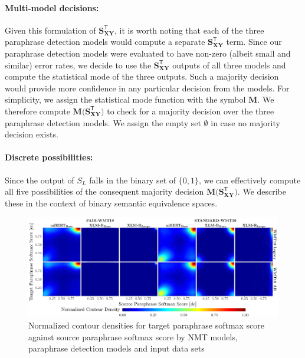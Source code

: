 \documentclass[11pt,a4paper]{article}
\begin{document}
\paragraph{Multi-model decisions:} Given this formulation of
$\mathbf{S_{XY}^{\mathsf{T}}}$, it is worth noting that each of the three
paraphrase detection models would compute a separate
$\mathbf{S_{XY}^{\mathsf{T}}}$ term. Since our paraphrase detection models were
evaluated to have non-zero (albeit small and similar) error rates, we decide to
use the $\mathbf{S_{XY}^{\mathsf{T}}}$ outputs of all three models and compute
the statistical mode of the three outputs. Such a majority decision would
provide more confidence in any particular decision from the models. For
simplicity, we assign the statistical mode function with the symbol
$\mathbf{M}$. We therefore compute $\mathbf{M(S_{XY}^{\mathsf{T}}})$ to check
for a majority decision over the three paraphrase detection models. We assign
the empty set $\emptyset$ in case no majority decision exists.

\paragraph{Discrete possibilities:} Since the output of $S_L$ falls in the
binary set of $\{0,1\}$, we can effectively compute all five possibilities of
the consequent majority decision $\mathbf{M(S_{XY}^{\mathsf{T}}})$. We describe
these in the context of binary semantic equivalence spaces.

\begin{figure}
  \centering \includegraphics[trim={0cm 0cm 0cm
    0cm},clip,width=\textwidth]{paraphrase_detection_softmax_all.pdf}
  \caption{Normalized contour densities for target paraphrase softmax score
    against source paraphrase softmax score by NMT models, paraphrase detection
    models and input data sets}
  \label{paraphrase_detection_softmax_all}
\end{figure}
\end{document}
